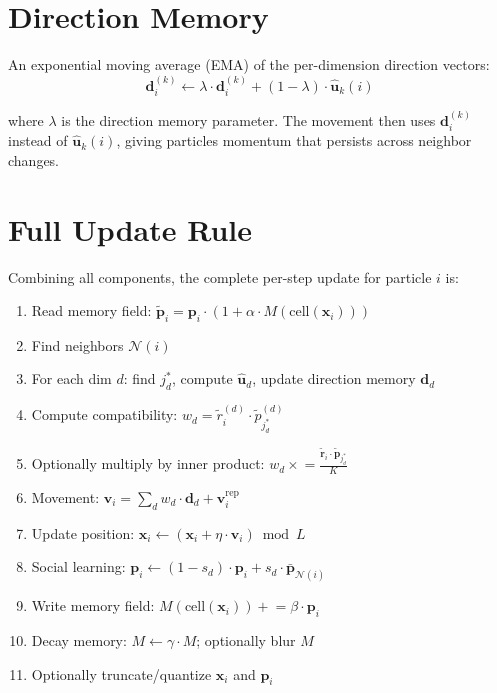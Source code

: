 \documentclass[11pt,a4paper]{article}
\begin{document}
\section{Direction Memory}

An exponential moving average (EMA) of the per-dimension direction vectors:
\begin{equation}
\mathbf{d}_i^{(k)} \leftarrow \lambda \cdot \mathbf{d}_i^{(k)} + (1 - \lambda) \cdot \hat{\mathbf{u}}_k(i)
\end{equation}

where $\lambda$ is the direction memory parameter. The movement then uses $\mathbf{d}_i^{(k)}$ instead of $\hat{\mathbf{u}}_k(i)$, giving particles momentum that persists across neighbor changes.

\section{Full Update Rule}

Combining all components, the complete per-step update for particle $i$ is:

\begin{enumerate}[nosep]
\item Read memory field: $\tilde{\mathbf{p}}_i = \mathbf{p}_i \cdot (1 + \alpha \cdot M(\mathrm{cell}(\mathbf{x}_i)))$
\item Find neighbors $\mathcal{N}(i)$
\item For each dim $d$: find $j^*_d$, compute $\hat{\mathbf{u}}_d$, update direction memory $\mathbf{d}_d$
\item Compute compatibility: $w_d = \tilde{r}_i^{(d)} \cdot \tilde{p}_{j^*_d}^{(d)}$
\item Optionally multiply by inner product: $w_d \mathrel{\times}= \frac{\tilde{\mathbf{r}}_i \cdot \tilde{\mathbf{p}}_{j^*_d}}{K}$
\item Movement: $\mathbf{v}_i = \sum_d w_d \cdot \mathbf{d}_d + \mathbf{v}_i^{\mathrm{rep}}$
\item Update position: $\mathbf{x}_i \leftarrow (\mathbf{x}_i + \eta \cdot \mathbf{v}_i) \bmod L$
\item Social learning: $\mathbf{p}_i \leftarrow (1 - s_d) \cdot \mathbf{p}_i + s_d \cdot \bar{\mathbf{p}}_{\mathcal{N}(i)}$
\item Write memory field: $M(\mathrm{cell}(\mathbf{x}_i)) \mathrel{+}= \beta \cdot \mathbf{p}_i$
\item Decay memory: $M \leftarrow \gamma \cdot M$; optionally blur $M$
\item Optionally truncate/quantize $\mathbf{x}_i$ and $\mathbf{p}_i$
\end{enumerate}
\end{document}
